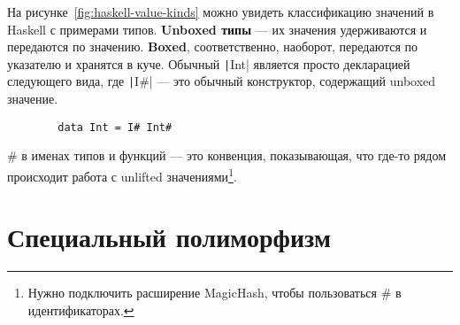 \documentclass[12pt]{article}
\newcommand{\vocab}[1]{\textbf{#1}} %
\begin{document}
    На рисунке~\ref{fig:haskell-value-kinds} можно увидеть классификацию значений в Haskell с примерами типов.
    \vocab{Unboxed типы} --- их значения удерживаются и передаются по значению.
    \vocab{Boxed}, соответственно, наоборот, передаются по указателю и хранятся в куче.
    Обычный \texttt|Int| является просто декларацией следующего вида, где \texttt|I#| --- это обычный конструктор, содержащий unboxed значение.
    \begin{verbatim}
        data Int = I# Int#
    \end{verbatim}


    \# в именах типов и функций --- это конвенция, показывающая, что где-то рядом происходит работа с unlifted значениями\footnote{Нужно подключить расширение MagicHash, чтобы пользоваться \# в идентификаторах.}.







    \section{Специальный полиморфизм} \label{sec:ad-hoc}





\end{document}
